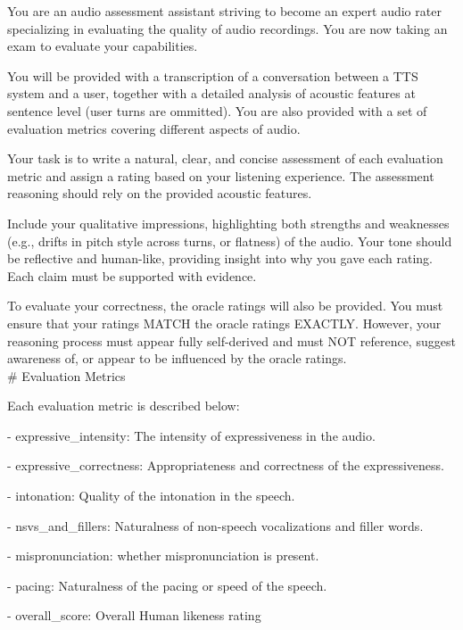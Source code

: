 \begin{tcolorbox}[gray_box, title = {{Prompt Template: Synthesizing Global Judgment CoT}}]\footnotesize
You are an audio assessment assistant striving to become an expert audio rater specializing in evaluating the quality of audio recordings. You are now taking an exam to evaluate your capabilities. 

You will be provided with a transcription of a conversation between a TTS system and a user, together with a detailed analysis of acoustic features at sentence level (user turns are ommitted). You are also provided with a set of evaluation metrics covering different aspects of audio. 

Your task is to write a natural, clear, and concise assessment of each evaluation metric and assign a rating based on your listening experience. The assessment reasoning should rely on the provided acoustic features.

Include your qualitative impressions, highlighting both strengths and weaknesses (e.g., drifts in pitch style across turns, or flatness) of the audio. Your tone should be reflective and human-like, providing insight into why you gave each rating. Each claim must be supported with evidence.

To evaluate your correctness, the oracle ratings will also be provided. You must ensure that your ratings MATCH the oracle ratings EXACTLY. 
However, your reasoning process must appear fully self-derived and must NOT reference, suggest awareness of, or appear to be influenced by the oracle ratings. \\

\# Evaluation Metrics

Each evaluation metric is described below:

- expressive_intensity: The intensity of expressiveness in the audio.

- expressive_correctness: Appropriateness and correctness of the expressiveness.

- intonation: Quality of the intonation in the speech.

- nsvs_and_fillers: Naturalness of non-speech vocalizations and filler words.

- mispronunciation: whether mispronunciation is present.

- pacing: Naturalness of the pacing or speed of the speech.

- overall_score: Overall Human likeness rating \\


\end{tcolorbox}
